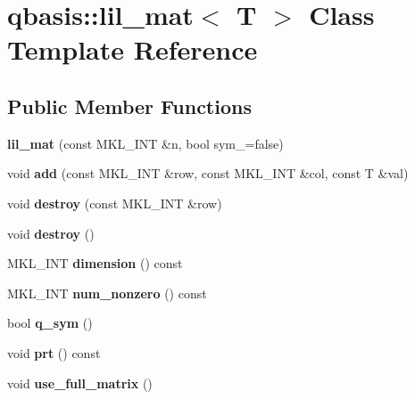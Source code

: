 \hypertarget{classqbasis_1_1lil__mat}{}\section{qbasis\+:\+:lil\+\_\+mat$<$ T $>$ Class Template Reference}
\label{classqbasis_1_1lil__mat}
\subsection*{Public Member Functions}
\begin{DoxyCompactItemize}
\item 
\mbox{\label{classqbasis_1_1lil__mat_a62f4efa5aeebf4f6c6b1ed923f82abd3}} 
{\bfseries lil\+\_\+mat} (const M\+K\+L\+\_\+\+I\+NT \&n, bool sym\+\_\+=false)
\item 
\mbox{\label{classqbasis_1_1lil__mat_a0dfef9ed25c3c47efb73acb2c612f4e5}} 
void {\bfseries add} (const M\+K\+L\+\_\+\+I\+NT \&row, const M\+K\+L\+\_\+\+I\+NT \&col, const T \&val)
\item 
\mbox{\label{classqbasis_1_1lil__mat_ac022ec2b29b701259d02e046971b73a7}} 
void {\bfseries destroy} (const M\+K\+L\+\_\+\+I\+NT \&row)
\item 
\mbox{\label{classqbasis_1_1lil__mat_a95fd3efb95fdba4e76e49a48d160d4d5}} 
void {\bfseries destroy} ()
\item 
\mbox{\label{classqbasis_1_1lil__mat_a0d3ab969d391617c7716e4372e2ed50f}} 
M\+K\+L\+\_\+\+I\+NT {\bfseries dimension} () const
\item 
\mbox{\label{classqbasis_1_1lil__mat_acfab7992777efc216e2e97e5654a2497}} 
M\+K\+L\+\_\+\+I\+NT {\bfseries num\+\_\+nonzero} () const
\item 
\mbox{\label{classqbasis_1_1lil__mat_a4b00141efd985a90fb5cafdeef2bfe63}} 
bool {\bfseries q\+\_\+sym} ()
\item 
\mbox{\label{classqbasis_1_1lil__mat_ac308f8f54fa99f75a0b954fa1f5049a6}} 
void {\bfseries prt} () const
\item 
\mbox{\label{classqbasis_1_1lil__mat_a81eef883d1698c912a45e9df498f3d12}} 
void {\bfseries use\+\_\+full\+\_\+matrix} ()
\end{DoxyCompactItemize}
